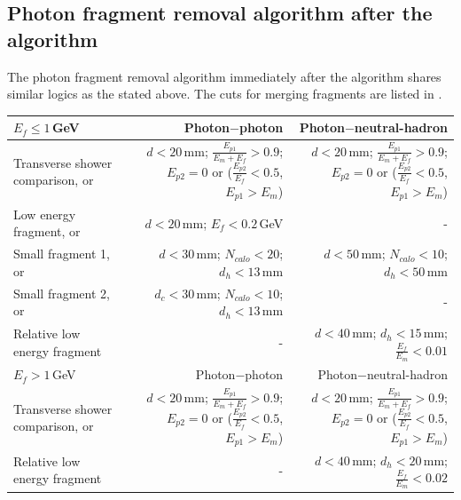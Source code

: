 \subsection{Photon fragment removal algorithm after the \PhotonReconstruction algorithm}

The photon fragment removal algorithm immediately after the \PhotonReconstruction algorithm shares similar logics as the stated above. The cuts for merging fragments are listed in .



\begin{table}[htbp]
\centering

\smallskip

\begin{tabular}{l  r  r }
\hline
\hline
$E_f\leqslant1$\,GeV &  Photon$-$photon & Photon$-$neutral-hadron \\
\hline
\multicolumn{1}{L{0.3\textwidth}}{Transverse shower comparison, or} & \multicolumn{1}{R{0.3\textwidth}}{$d < 20 $\,mm; $\frac{E_{p1}}{E_m + E_f} > 0.9 $; $E_{p2} = 0$ or ($\frac{E_{p2}}{E_f} < 0.5 $, $E_{p1} > E_m$)}  & \multicolumn{1}{R{0.3\textwidth}}{$d < 20 $\,mm; $\frac{E_{p1}}{E_m + E_f} > 0.9 $; $E_{p2} = 0$ or ($\frac{E_{p2}}{E_f} < 0.5 $, $E_{p1} > E_m$)} \\
\multicolumn{1}{L{0.3\textwidth}}{Low energy fragment, or} & \multicolumn{1}{R{0.3\textwidth}}{$d < 20 $\,mm; $E_f < 0.2 $\,GeV}  & \multicolumn{1}{R{0.3\textwidth}}{-} \\
\multicolumn{1}{L{0.3\textwidth}}{Small fragment 1, or} & \multicolumn{1}{R{0.3\textwidth}}{$d < 30 $\,mm; $N_{calo} < 20 $; $d_h < 13 $\,mm}  & \multicolumn{1}{R{0.3\textwidth}}{$d < 50 $\,mm; $N_{calo} < 10 $; $d_h < 50$\,mm} \\
\multicolumn{1}{L{0.3\textwidth}}{Small fragment 2, or} & \multicolumn{1}{R{0.3\textwidth}}{$d_c < 30 $\,mm; $N_{calo} < 10 $; $d_h < 13 $\,mm}  & \multicolumn{1}{R{0.3\textwidth}}{-} \\

\multicolumn{1}{L{0.3\textwidth}}{Relative low energy fragment} & \multicolumn{1}{R{0.3\textwidth}}{-}  & \multicolumn{1}{R{0.3\textwidth}}{$d < 40$\,mm; $d_h < 15$\,mm; $\frac{E_{f}}{E_m} < 0.01$} \\
\hline
$E_f>1$\,GeV &  Photon$-$photon & Photon$-$neutral-hadron \\
\hline
\multicolumn{1}{L{0.3\textwidth}}{Transverse shower comparison, or} & \multicolumn{1}{R{0.3\textwidth}}{$d< 20$\,mm; $\frac{E_{p1}}{E_m + E_f} > 0.9 $; $E_{p2} = 0$ or ($\frac{E_{p2}}{E_f} < 0.5 $, $E_{p1} > E_m$)}  & \multicolumn{1}{R{0.3\textwidth}}{$d< 20$\,mm; $\frac{E_{p1}}{E_m + E_f} > 0.9 $; $E_{p2} = 0$ or ($\frac{E_{p2}}{E_f} < 0.5 $, $E_{p1} > E_m$)} \\
\multicolumn{1}{L{0.3\textwidth}}{Relative low energy fragment } & \multicolumn{1}{R{0.3\textwidth}}{-} & \multicolumn{1}{R{0.3\textwidth}}{$d < 40$\,mm; $d_h < 20$\,mm; $\frac{E_f}{E_m} < 0.02$} \\
\hline
\hline
\end{tabular}


\end{table}
